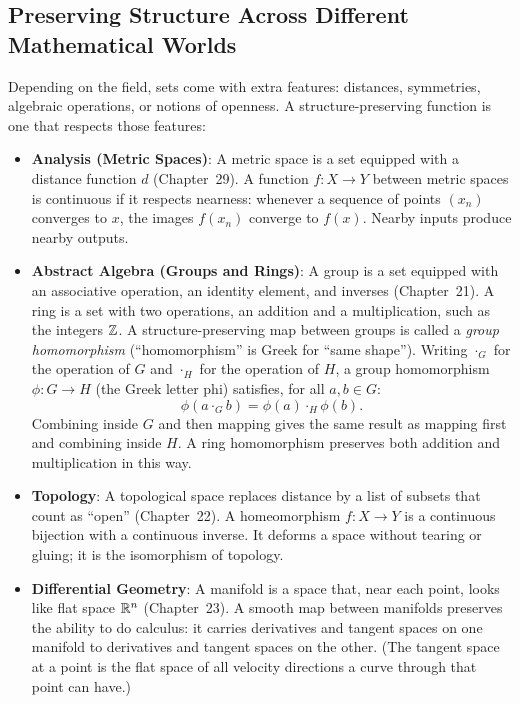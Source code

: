\subsection{Preserving Structure Across Different Mathematical Worlds}

Depending on the field, sets come with extra features: distances, symmetries, algebraic operations, or notions of openness. A structure-preserving function is one that respects those features:

\begin{itemize}
  \item \textbf{Analysis (Metric Spaces)}: A metric space is a set equipped with a distance function $d$ (Chapter~29). A function $f: X \to Y$ between metric spaces is continuous if it respects nearness: whenever a sequence of points $(x_n)$ converges to $x$, the images $f(x_n)$ converge to $f(x)$. Nearby inputs produce nearby outputs.
  \item \textbf{Abstract Algebra (Groups and Rings)}: A group is a set equipped with an associative operation, an identity element, and inverses (Chapter~21). A ring is a set with two operations, an addition and a multiplication, such as the integers $\mathbb{Z}$. A structure-preserving map between groups is called a \emph{group homomorphism} (``homomorphism'' is Greek for ``same shape''). Writing $\cdot_G$ for the operation of $G$ and $\cdot_H$ for the operation of $H$, a group homomorphism $\phi: G \to H$ (the Greek letter phi) satisfies, for all $a, b \in G$:
  \[
  \phi(a \cdot_G b) = \phi(a) \cdot_H \phi(b).
  \]
  Combining inside $G$ and then mapping gives the same result as mapping first and combining inside $H$. A ring homomorphism preserves both addition and multiplication in this way.
  \item \textbf{Topology}: A topological space replaces distance by a list of subsets that count as ``open'' (Chapter~22). A homeomorphism $f: X \to Y$ is a continuous bijection with a continuous inverse. It deforms a space without tearing or gluing; it is the isomorphism of topology.
  \item \textbf{Differential Geometry}: A manifold is a space that, near each point, looks like flat space $\mathbb{R}^n$ (Chapter~23). A smooth map between manifolds preserves the ability to do calculus: it carries derivatives and tangent spaces on one manifold to derivatives and tangent spaces on the other. (The tangent space at a point is the flat space of all velocity directions a curve through that point can have.)
\end{itemize}

